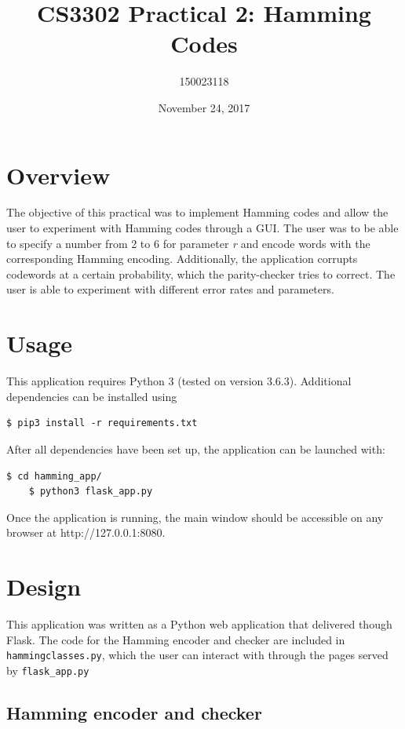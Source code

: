 \documentclass[11pt, oneside]{article}   	%
\title{CS3302 Practical 2: Hamming Codes}
\author{150023118}
\date{November 24, 2017}
\begin{document}
\maketitle
\section*{Overview}

The objective of this practical was to implement Hamming codes and allow the user to experiment with Hamming codes through a GUI. The user was to be able to specify a number from 2 to 6 for parameter \textit{r} and encode words with the corresponding Hamming encoding. Additionally, the application corrupts codewords at a certain probability, which the parity-checker tries to correct. The user is able to experiment with different error rates and parameters. 

\section*{Usage}

This application requires Python 3 (tested on version 3.6.3). Additional dependencies can be installed using

\begin{Verbatim}[tabsize=4]
	$ pip3 install -r requirements.txt
\end{Verbatim}

After all dependencies have been set up, the application can be launched with:

\begin{Verbatim}[tabsize=4]
	$ cd hamming_app/
	$ python3 flask_app.py
\end{Verbatim}

Once the application is running, the main window should be accessible on any browser at http://127.0.0.1:8080. 

\section*{Design}

This application was written as a Python web application that delivered though Flask. The code for the Hamming encoder and checker are included in \verb!hammingclasses.py!, which the user can interact with through the pages served by \verb!flask_app.py!

\subsection*{Hamming encoder and checker}
\end{document}
